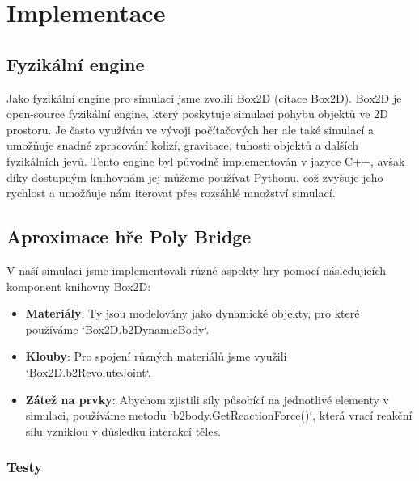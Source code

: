 \chapter{Implementace}





\section{Fyzikální engine}

Jako fyzikální engine pro simulaci jsme zvolili Box2D (citace Box2D). Box2D je open-source fyzikální engine, který poskytuje simulaci pohybu objektů ve 2D prostoru. Je často využíván ve vývoji počítačových her ale také simulací a umožňuje snadné zpracování kolizí, gravitace, tuhosti objektů a dalších fyzikálních jevů. Tento engine byl původně implementován v jazyce C++, avšak díky dostupným knihovnám jej můžeme používat Pythonu, což zvyšuje jeho rychlost a umožňuje nám iterovat přes rozsáhlé množství simulací.

\section{Aproximace hře Poly Bridge}

V naší simulaci jsme implementovali různé aspekty hry pomocí následujících komponent knihovny Box2D:

\begin{itemize}
    \item \textbf{Materiály}: Ty jsou modelovány jako dynamické objekty, pro které používáme `Box2D.b2DynamicBody`.
    \item \textbf{Klouby}: Pro spojení různých materiálů jsme využili `Box2D.b2RevoluteJoint`.
    \item \textbf{Zátež na prvky}: Abychom zjistili síly působící na jednotlivé elementy v simulaci, používáme metodu `b2body.GetReactionForce()`, která vrací reakční sílu vzniklou v důsledku interakcí těles.
\end{itemize}

\subsection{Testy}

